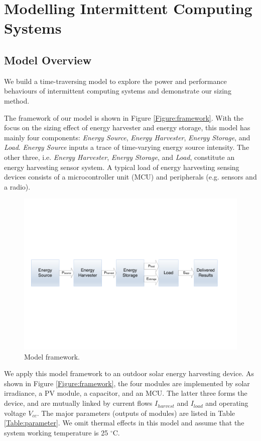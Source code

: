 \section{Modelling Intermittent Computing Systems}

\subsection{Model Overview}

We build a time-traversing model to explore the power and performance behaviours of intermittent computing systems and demonstrate our sizing method.

The framework of our model is shown in Figure \ref{Figure:framework}. With the focus on the sizing effect of energy harvester and energy storage, this model has mainly four components: \textit{Energy Source}, \textit{Energy Harvester}, \textit{Energy Storage}, and \textit{Load}. \textit{Energy Source} inputs a trace of time-varying energy source intensity. The other three, i.e. \textit{Energy Harvester}, \textit{Energy Storage}, and \textit{Load}, constitute an energy harvesting sensor system. A typical load of energy harvesting sensing devices consists of a microcontroller unit (MCU) and peripherals (e.g. sensors and a radio).

\begin{figure}[H]
    \centering
    \includegraphics[width=15cm]{figure/work1/model}
    \caption{Model framework.}
    \label{Figure:model}
\end{figure}

We apply this model framework to an outdoor solar energy harvesting device. As shown in Figure \ref{Figure:framework}, the four modules are implemented by solar irradiance, a PV module, a capacitor, and an MCU. The latter three forms the device, and are mutually linked by current flows $I_{harvest}$ and $I_{load}$ and operating voltage $V_{cc}$. The major parameters (outputs of modules) are listed in Table \ref{Table:parameter}. We omit thermal effects in this model and assume that the system working temperature is 25 $^{\circ}$C.

